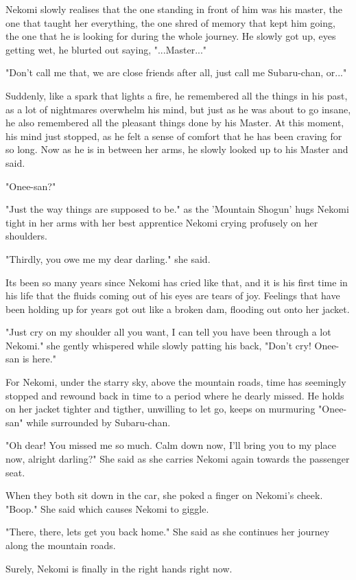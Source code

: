 Nekomi slowly realises that the one standing in front of him was his master, the one that taught her everything, the one shred of memory that kept him going, the one that he is looking for during the whole journey. He slowly got up, eyes getting wet, he blurted out saying, "...Master..."

"Don't call me that, we are close friends after all, just call me Subaru-chan, or..."

Suddenly, like a spark that lights a fire, he remembered all the things in his past, as a lot of nightmares overwhelm his mind, but just as he was about to go insane, he also remembered all the pleasant things done by his Master. At this moment, his mind just stopped, as he felt a sense of comfort that he has been craving for so long. Now as he is in between her arms, he slowly looked up to his Master and said.

"Onee-san?"

"Just the way things are supposed to be." as the 'Mountain Shogun' hugs Nekomi tight in her arms with her best apprentice Nekomi crying profusely on her shoulders.

"Thirdly, you owe me my dear darling." she said.

Its been so many years since Nekomi has cried like that, and it is his first time in his life that the fluids coming out of his eyes are tears of joy. Feelings that have been holding up for years got out like a broken dam, flooding out onto her jacket.

"Just cry on my shoulder all you want, I can tell you have been through a lot Nekomi." she gently whispered while slowly patting his back, "Don't cry! Onee-san is here."

For Nekomi, under the starry sky, above the mountain roads, time has seemingly stopped and rewound back in time to a period where he dearly missed. He holds on her jacket tighter and tigther, unwilling to let go, keeps on murmuring "Onee-san" while surrounded by Subaru-chan.

"Oh dear! You missed me so much. Calm down now, I'll bring you to my place now, alright darling?" She said as she carries Nekomi again towards the passenger seat.

When they both sit down in the car, she poked a finger on Nekomi's cheek. "Boop." She said which causes Nekomi to giggle.

"There, there, lets get you back home." She said as she continues her journey along the mountain roads.

Surely, Nekomi is finally in the right hands right now.
